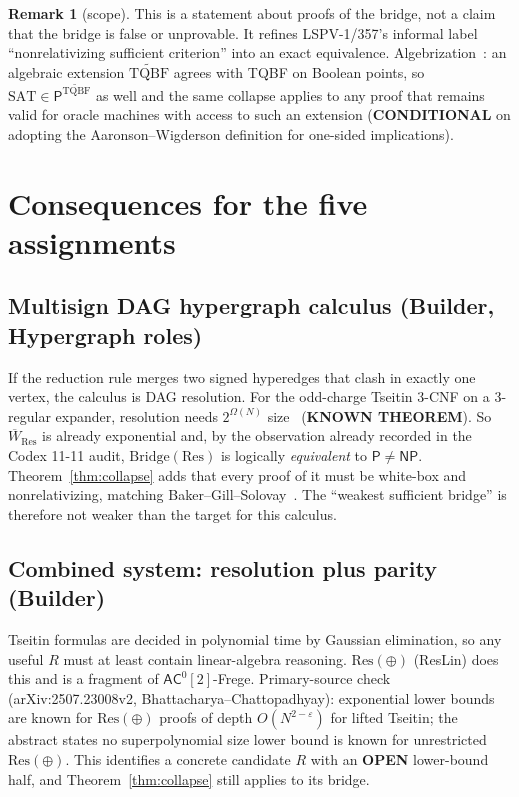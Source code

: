 \documentclass[11pt]{article}
\theoremstyle{definition}
\newtheorem{remark}[theorem]{Remark}
\newcommand{\SAT}{\mathrm{SAT}}
\newcommand{\Wb}{\overline W}
\begin{document}
\begin{remark}[scope]
This is a statement about proofs of the bridge, not a claim that the bridge is false or unprovable.
It refines LSPV-1/357's informal label ``nonrelativizing sufficient criterion'' into an exact
equivalence. Algebrization~\cite{AW09}: an algebraic extension $\widetilde{\mathrm{TQBF}}$ agrees with
TQBF on Boolean points, so $\SAT\in\mathsf P^{\widetilde{\mathrm{TQBF}}}$ as well and the same collapse
applies to any proof that remains valid for oracle machines with access to such an extension
(\textbf{CONDITIONAL} on adopting the Aaronson--Wigderson definition for one-sided implications).
\end{remark}

\section{Consequences for the five assignments}
\subsection*{Multisign DAG hypergraph calculus (Builder, Hypergraph roles)}
If the reduction rule merges two signed hyperedges that clash in exactly one vertex, the calculus is DAG
resolution. For the odd-charge Tseitin 3-CNF on a 3-regular expander, resolution needs
$2^{\Omega(N)}$ size~\cite{Urq87,BSW01} (\textbf{KNOWN THEOREM}). So $\Wb_{\mathrm{Res}}$ is already
exponential and, by the observation already recorded in the Codex 11-11 audit, $\mathrm{Bridge}(\mathrm{Res})$
is logically \emph{equivalent} to $\mathsf P\ne\mathsf{NP}$. Theorem~\ref{thm:collapse} adds that every
proof of it must be white-box and nonrelativizing, matching Baker--Gill--Solovay~\cite{BGS75}.
The ``weakest sufficient bridge'' is therefore not weaker than the target for this calculus.

\subsection*{Combined system: resolution plus parity (Builder)}
Tseitin formulas are decided in polynomial time by Gaussian elimination, so any useful
$R$ must at least contain linear-algebra reasoning. $\mathrm{Res}(\oplus)$ (ResLin) does this
and is a fragment of $\mathsf{AC}^0[2]$-Frege. Primary-source check (arXiv:2507.23008v2,
Bhattacharya--Chattopadhyay): exponential lower bounds are known for $\mathrm{Res}(\oplus)$ proofs of
depth $O(N^{2-\varepsilon})$ for lifted Tseitin; the abstract states no superpolynomial size lower
bound is known for unrestricted $\mathrm{Res}(\oplus)$. This identifies a concrete candidate $R$ with an
\textbf{OPEN} lower-bound half, and Theorem~\ref{thm:collapse} still applies to its bridge.
\end{document}
